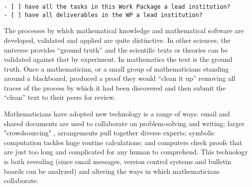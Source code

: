 \begin{draft}
\begin{verbatim}
- [ ] have all the tasks in this Work Package a lead institution?
- [ ] have all deliverables in the WP a lead institution?
\end{verbatim}
\end{draft}



\begin{workpackage}[id=social-aspects,wphases=0-48,
  title=Social Aspects,
  lead=UO,
  UORM=53,USHRM=8, USORM=6]


\begin{wpobjectives}

The processes by which mathematical knowledge and mathematical
software are developed, validated and applied are quite
distinctive. In other sciences, the universe provides ``ground truth''
and the scientific texts or theories can be validated against that by
experiment. In mathematics the text is the ground truth. Once 
 a mathematician, or a small group of
mathematicians standing around a blackboard, produced a proof they
would ``clean it up'' removing all traces of the process by which it
had been discovered and then submit the ``clean'' text to their peers
for review. 

Mathematicians have adopted new technology is a range of ways: email
and shared documents are used to collaborate on problem-solving and
writing; larger "crowdsourcing" \cite{polymath_SIAM, PolymathBlog}, arrangements
pull together diverse  experts; symbolic computation tackles huge routine
calculations; and computers  check  proofs that are just too long and 
complicated for any human to comprehend. This technology is both
revealing (since email messages, version control systems and bulletin
boards can be analyzed) and altering the ways in which mathematicians
collaborate. 


\end{wpobjectives}
\end{workpackage}

